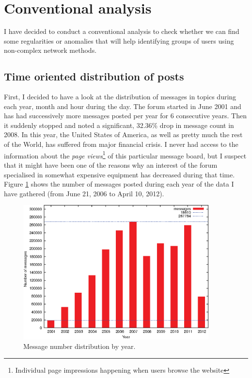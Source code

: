 \newpage
\section{Conventional analysis}

  I have decided to conduct a conventional analysis to check whether we can find some regularities or anomalies that will help identifying groups of users using non-complex network methods.
  
  \subsection{Time oriented distribution of posts}
  
    First, I decided to have a look at the distribution of messages in topics during each year, month and hour during the day. The forum started in June 2001 and has had successively more messages posted per year for 6 consecutive years. Then it suddenly stopped and noted a significant, 32.36\% drop in message count in 2008. In this year, the United States of America, as well as pretty much the rest of the World, has suffered from major financial crisis. I never had access to the information about the \emph{page views}\footnote{Individual page impressions happening when users browse the website} of this particular message board, but I suspect that it might have been one of the reasons why an interest of the forum specialised in somewhat expensive equipment has decreased during that time. Figure \ref{fig:dist_year} shows the number of messages posted during each year of the data I have gathered (from June 21, 2006 to April 10, 2012).
    \begin{figure}[H]
      \centering
      \includegraphics[width=0.9\textwidth]{chapters/03_implementation/yearly}
      \caption{Message number distribution by year.}
      \label{fig:dist_year}
    \end{figure}
    
